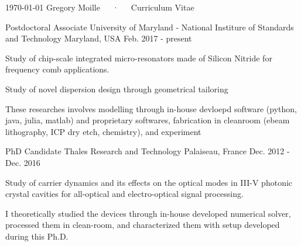 \documentclass[11pt, letterpaper]{awesome-cv}
\begin{document}
\makecvheader
\makecvfooter
  {\today}
  {Gregory Moille~~~·~~~Curriculum Vitae}
  {\thepage}


\begin{cventries}%
    \cventry%
    {Postdoctoral Associate} %
    {University of Maryland - National Institure of Standards and Technology} %
    {Maryland, USA} %
    {Feb. 2017 - present} %
    {
      \begin{cvitems} %
        \item {Study of chip-scale integrated micro-resonators made of Silicon Nitride for frequency comb applications.}
        \item{Study of novel dispersion design through geometrical tailoring}
        \item{These researches involves modelling through in-house devloepd software (python, java, julia, matlab) and proprietary softwares, fabrication in cleanroom (ebeam lithography, ICP dry etch, chemistry), and experiment}
      \end{cvitems}
    }
    \cventry
    {PhD Candidate} %
    {Thales Research and Technology} %
    {Palaiseau, France} %
    {Dec. 2012 - Dec. 2016} %
    {
      \begin{cvitems} %
        \item {Study of carrier dynamics and its effects on the optical modes in III-V photonic crystal cavities for all-optical
        and electro-optical signal processing.}
        \item {I theoretically studied the devices through in-house developed numerical solver, processed them in clean-room, and characterized them with setup developed during this Ph.D.}
      \end{cvitems}
    }
\end{cventries}
\end{document}
